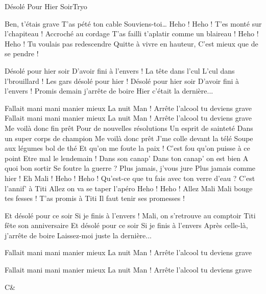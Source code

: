 \documentclass[a4paper,11pt,french]{article}
\begin{document}
\begin{Song}{Désolé Pour Hier Soir}{Tryo}
\begin{multicols}{2}
\begin{Verse}
Ben, t'étais grave
T'as pété ton cable
Souviens-toi\dots
Heho ! Heho !
T'es monté sur l'chapiteau !
Accroché au cordage
T'as failli t'aplatir comme un blaireau !
Heho ! Heho !
Tu voulais pas redescendre
Quitte à vivre en hauteur,
C'est mieux que de se pendre !
\end{Verse}
\begin{Chorus}
Désolé pour hier soir
D'avoir fini à l'envers !
La tête dans l'cul
L'cul dans l'brouillard !
Les gars désolé pour hier !
Désolé pour hier soir
D'avoir fini à l'envers !
Promis demain j'arrête de boire
Hier c'était la dernière...
\end{Chorus}
\begin{Verse}
Fallait mani mani manier mieux
La nuit Man !
Arrête l'alcool tu deviens grave
Fallait mani mani manier mieux
La nuit Man !
Arrête l'alcool tu deviens grave
Me voilà donc fin prêt
Pour de nouvelles résolutions
Un esprit de sainteté
Dans un super corps de champion
Me voilà donc prêt
J'me colle devant la télé
Soupe aux légumes bol de thé
Et qu'on me foute la paix !
C'est fou qu'on puisse à ce point
Etre mal le lendemain !
Dans son canap'
Dans ton canap' on est bien
A quoi bon sortir
Se foutre la guerre ?
Plus jamais, j'vous jure
Plus jamais comme hier !
Eh Mali !
Heho ! Heho !
Qu'est-ce que tu fais avec ton verre d'eau ?
C'est l'annif' à Titi
Allez on va se taper l'apéro
Heho ! Heho !
Allez Mali Mali bouge tes fesses !
T'as promis à Titi 
Il faut tenir ses promesses !
\end{Verse}
\begin{Chorus}
Et désolé pour ce soir 
Si je finis à l'envers !
Mali, on s'retrouve au comptoir
Titi fête son anniversaire
Et désolé pour ce soir
Si je finis à l'envers
Après celle-là, j'arrête de boire
Laissez-moi juste la dernière...
\end{Chorus}
\begin{Verse}
Fallait mani mani manier mieux
La nuit Man !
Arrête l'alcool tu deviens grave

Fallait mani mani manier mieux
La nuit Man !
Arrête l'alcool tu deviens grave
\end{Verse}
\end{multicols}

\vfill

\begin{Chords}
\hline
C\mineur & \\\hline
\end{Chords}

\vfill

\end{Song}
\end{document}
